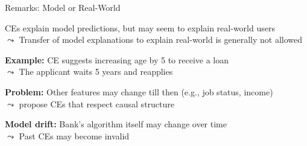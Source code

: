 \documentclass[10pt,compress,t,notes=noshow, xcolor=table]{beamer}
\begin{document}
\begin{framev}[align=top]{Remarks: Model or Real-World}
\begin{itemizeM}
\item CEs explain model predictions, but may seem to explain real-world users\\
$\leadsto$ Transfer of model explanations to explain real-world is generally not allowed
\item \textbf{Example:} CE suggests increasing age by 5 to receive a loan\\
$\leadsto$ The applicant waits 5 years and reapplies
\pause
\item \textbf{Problem:} Other features may change till then (e.g., job status, income)\\
$\leadsto$  propose CEs that respect causal structure
\item \textbf{Model drift:} Bank's algorithm itself may change over time\\
$\leadsto$ Past CEs may become invalid
\end{itemizeM}
\end{framev}

\endlecture
\end{document}
